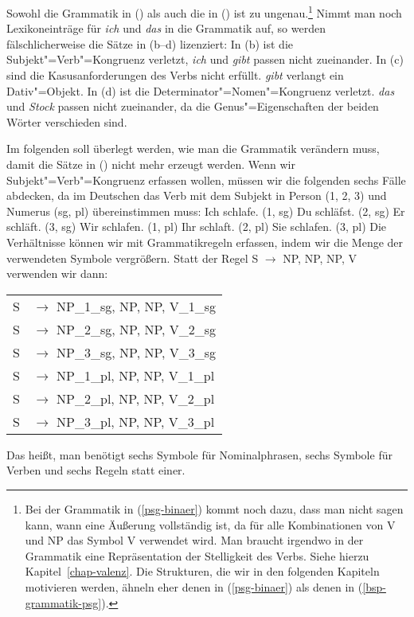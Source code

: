 \noindent
Sowohl die Grammatik in () als auch die in () ist zu ungenau.\footnote{
  Bei der Grammatik in (\ref{psg-binaer}) kommt noch dazu, dass man nicht sagen kann,
  wann eine Äußerung vollständig ist, da für alle Kombinationen von V und NP das Symbol
  V verwendet wird. Man braucht irgendwo in der Grammatik eine Repräsentation der Stelligkeit
  des Verbs. Siehe hierzu Kapitel~\ref{chap-valenz}. Die Strukturen, die wir in den folgenden
  Kapiteln motivieren werden, ähneln eher denen in (\ref{psg-binaer}) als denen in (\ref{bsp-grammatik-psg}).%
}
Nimmt man noch Lexikoneinträge für \emph{ich} und \emph{das} in die Grammatik auf, so werden
fälschlicherweise die Sätze in (b--d) lizenziert:
\eal
{}
\zl
In (b) ist die Subjekt"=Verb"=Kongruenz verletzt, \emph{ich} und \emph{gibt} passen
nicht zueinander. In (c) sind die Kasusanforderungen des Verbs nicht erfüllt.
\emph{gibt} verlangt ein Dativ"=Objekt. In (d) ist die Determinator"=Nomen"=Kongruenz
verletzt. \emph{das} und \emph{Stock} passen nicht zueinander, da die Genus"=Eigenschaften der
beiden Wörter verschieden sind.

Im folgenden soll überlegt werden, wie man die Grammatik verändern muss, damit die Sätze in ()
nicht mehr erzeugt werden. Wenn wir Subjekt"=Verb"=Kongruenz erfassen wollen, müssen
wir die folgenden sechs Fälle abdecken, da im Deutschen das Verb mit dem Subjekt in Person (1, 2, 3)
und Numerus (sg, pl) übereinstimmen muss:
\eal\jamwidth=8cm\relax
\ex Ich schlafe.  \jam(1, sg)
\ex Du schläfst.  \jam(2, sg)
\ex Er schläft.   \jam(3, sg)
\ex Wir schlafen. \jam(1, pl)
\ex Ihr schlaft.  \jam(2, pl)
\ex Sie schlafen. \jam(3, pl)
\zl
Die Verhältnisse können wir mit Grammatikregeln erfassen, indem wir die Menge der verwendeten
Symbole vergrößern. Statt der Regel S $\to$ NP, NP, NP, V verwenden wir dann:
\ea
\begin{tabular}[t]{@{}l@{ }l}
S  & $\to$ NP\_1\_sg, NP, NP, V\_1\_sg\\
S  & $\to$ NP\_2\_sg, NP, NP, V\_2\_sg\\
S  & $\to$ NP\_3\_sg, NP, NP, V\_3\_sg\\
S  & $\to$ NP\_1\_pl, NP, NP, V\_1\_pl\\
S  & $\to$ NP\_2\_pl, NP, NP, V\_2\_pl\\
S  & $\to$ NP\_3\_pl, NP, NP, V\_3\_pl\\
\end{tabular}
\z
Das heißt, man benötigt sechs Symbole für Nominalphrasen, sechs Symbole für Verben und 
sechs Regeln statt einer.

